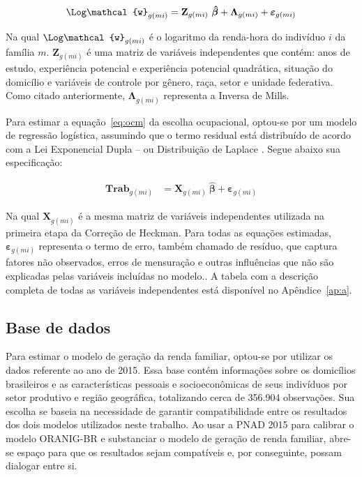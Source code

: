 \begin{align}
	\mathbf{\Log \mathcal{w}}_{g(mi)} = \mathbf{Z}_{g(mi)} \ \boldsymbol{\hat{\beta}} + \boldsymbol{\Lambda}_{g(mi)} + \boldsymbol{\varepsilon}_{g(mi)} \label{eq:step2}
\end{align}

Na qual $\mathbf{\Log \mathcal{w}}_{g(mi)}$ é o logaritmo da renda-hora do indivíduo $i$ da família $m$. $\mathbf{Z}_{g(mi)}$ é uma matriz de variáveis independentes que contém: anos de estudo, experiência potencial e experiência potencial quadrática, situação do domicílio e variáveis de controle por gênero, raça, setor e unidade federativa. Como citado anteriormente, $\boldsymbol{\Lambda}_{g(mi)}$ representa a Inversa de Mills.

Para estimar a equação~\eqref{eq:ocm} da escolha ocupacional, optou-se por um modelo de regressão logística, assumindo que o termo residual está distribuído de acordo com a Lei Exponencial Dupla -- ou Distribuição de Laplace \cite{bourguignon05}. Segue abaixo sua especificação:

\begin{align}
	\textbf{Trab}_{g(mi)} &= \mathbf{X}_{g(mi)} \ \boldsymbol{\hat{\beta}} + \boldsymbol{\varepsilon}_{g(mi)} \label{eq:logit}
\end{align}

Na qual $\mathbf{X}_{g(mi)}$ é a mesma matriz de variáveis independentes utilizada na primeira etapa da Correção de Heckman. Para todas as equações estimadas, $\boldsymbol{\varepsilon}_{g(mi)}$ representa o termo de erro, também chamado de resíduo, que captura fatores não observados, erros de mensuração e outras influências que não são explicadas pelas variáveis incluídas no modelo.. A tabela com a descrição completa de todas as variáveis independentes está disponível no Apêndice~\ref{ap:a}.


\subsection{Base de dados} \label{subsec:dados_microssimulacao}

Para estimar o modelo de geração da renda familiar, optou-se por utilizar os dados  referente ao ano de 2015. Essa base contém informações	sobre os domicílios brasileiros e as características pessoais e socioeconômicas de seus indivíduos por setor produtivo e região geográfica, totalizando cerca de 356.904 observações. Sua escolha se baseia na necessidade de garantir compatibilidade entre os resultados dos dois modelos utilizados neste trabalho. Ao usar a PNAD 2015 para calibrar o modelo ORANIG-BR e substanciar o modelo de geração de renda familiar, abre-se espaço para que os resultados sejam compatíveis e, por conseguinte, possam dialogar entre si.


